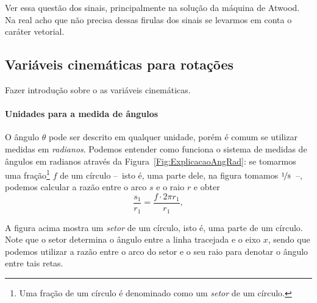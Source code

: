 Ver essa questão dos sinais, principalmente na solução da máquina de Atwood. Na real acho que não precisa dessas firulas dos sinais se levarmos em conta o caráter vetorial.

\subsection{Variáveis cinemáticas para rotações}

Fazer introdução sobre o as variáveis cinemáticas.

\paragraph{Unidades para a medida de ângulos}

O ângulo $\theta$ pode ser descrito em qualquer unidade, porém é comum se utilizar medidas em \emph{radianos}. Podemos entender como funciona o sistema de medidas de ângulos em radianos através da Figura~\ref{Fig:ExplicacaoAngRad}: se tomarmos uma fração\footnote{Uma fração de um círculo é denominado como um \emph{setor} de um círculo.} $f$ de um círculo --~isto é, uma parte dele, na figura tomamos $\nicefrac{1}{8}$~--, podemos calcular a razão entre o arco $s$ e o raio $r$ e obter
\begin{equation}
    \frac{s_1}{r_1} = \frac{f\cdot 2\pi r_1}{r_1},
\end{equation}
%
\begin{marginfigure}
\centering
{}
\caption{A figura acima mostra um \emph{setor} de um círculo, isto é, uma parte de um círculo. Note que o setor determina o ângulo entre a linha tracejada e o eixo $x$, sendo que podemos utilizar a razão entre o arco do setor e o seu raio para denotar o ângulo entre tais retas. \label{Fig:ExplicacaoAngRad}}
\end{marginfigure}

